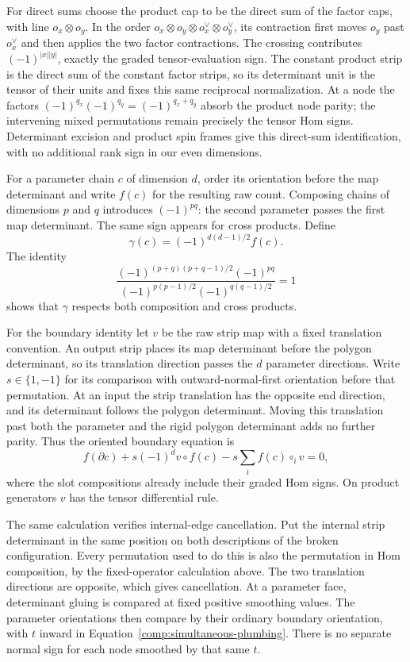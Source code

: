 For direct sums choose the product cap to be the direct sum of the
factor caps, with line $o_x\otimes o_y$.  In the order
$o_x\otimes o_y\otimes o_x^\vee\otimes o_y^\vee$, its contraction
first moves $o_y$ past $o_x^\vee$ and then applies the two factor
contractions.  The crossing contributes $(-1)^{|x||y|}$, exactly
the graded tensor-evaluation sign.  The constant product strip is
the direct sum of the constant factor strips, so its determinant
unit is the tensor of their units and fixes this same reciprocal
normalization.  At a node the factors
$(-1)^{q_x}(-1)^{q_y}=(-1)^{q_x+q_y}$ absorb the product node parity;
the intervening mixed permutations remain precisely the tensor
Hom signs.  Determinant excision and product spin frames give
this direct-sum identification, with no additional rank sign in
our even dimensions.

For a parameter chain $c$ of dimension $d$, order its orientation
before the map determinant and write $f(c)$ for the resulting raw
count.  Composing chains of dimensions $p$ and $q$ introduces
$(-1)^{pq}$: the second parameter passes the first map
determinant.  The same sign appears for cross products.  Define
\begin{equation}
 \gamma(c)=(-1)^{d(d-1)/2}f(c).
 \label{comp:count-normalization}
\end{equation}
The identity
\[
 \frac{(-1)^{(p+q)(p+q-1)/2}(-1)^{pq}}
      {(-1)^{p(p-1)/2}(-1)^{q(q-1)/2}}=1
\]
shows that $\gamma$ respects both composition and cross products.

For the boundary identity let $v$ be the raw strip map with a fixed
translation convention.  An output strip places its map
determinant before the polygon determinant, so its translation
direction passes the $d$ parameter directions.  Write $s\in\{1,-1\}$
for its comparison with outward-normal-first orientation before
that permutation.  At an input the strip translation has the
opposite end direction, and its determinant follows the polygon
determinant.  Moving this translation past both the parameter and
the rigid polygon determinant adds no further parity.  Thus the
oriented boundary equation is
\begin{equation}
 f(\partial c)+s(-1)^d v\circ f(c)
       -s\sum_i f(c)\circ_i v=0,
 \label{comp:raw-boundary}
\end{equation}
where the slot compositions already include their graded Hom
signs.  On product generators $v$ has the tensor differential
rule.

The same calculation verifies internal-edge cancellation.  Put
the internal strip determinant in the same position on both
descriptions of the broken configuration.  Every permutation used
to do this is also the permutation in Hom composition, by the
fixed-operator calculation above.  The two translation directions
are opposite, which gives cancellation.  At a parameter face,
determinant gluing is compared at fixed positive smoothing values.
The parameter orientations then compare by their ordinary
boundary orientation, with $t$ inward in
Equation~\eqref{comp:simultaneous-plumbing}.  There is no separate
normal sign for each node smoothed by that same $t$.

